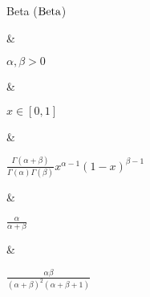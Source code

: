Beta ($\operatorname{Beta}$)

&

$\alpha, \beta > 0$

&

$x \in [0, 1]$

&

\(\displaystyle
	\frac{\Gamma(\alpha + \beta)}{\Gamma(\alpha)\Gamma(\beta)} x^{\alpha - 1} (1 - x)^{\beta - 1}
\)

&

$\frac{\alpha}{\alpha + \beta}$

&

$\frac{\alpha\beta}{(\alpha + \beta)^2(\alpha + \beta + 1)}$